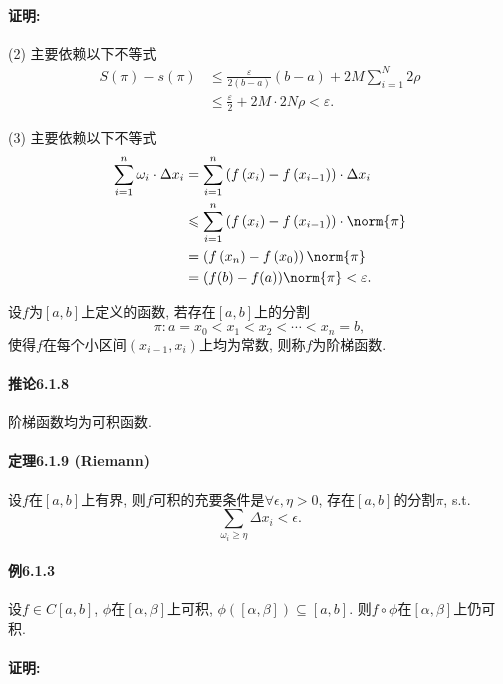 \paragraph{证明:}

(2) 主要依赖以下不等式
\[
\begin{aligned}S(\pi)-s(\pi) & \leqslant\frac{\varepsilon}{2(b-a)}(b-a)+2M\sum_{i=1}^{N}2\rho\\
	& \leqslant\frac{\varepsilon}{2}+2M\cdot2N\rho<\varepsilon.
\end{aligned}
\]

(3) 主要依赖以下不等式
\[
\begin{aligned}\sum_{i=1}^{n}\omega_{i}\cdot\Delta x_{i} & =\sum_{i=1}^{n}\left(f\left(x_{i}\right)-f\left(x_{i-1}\right)\right)\cdot\Delta x_{i}\\
	& \leqslant\sum_{i=1}^{n}\left(f\left(x_{i}\right)-f\left(x_{i-1}\right)\right)\cdot\norm{\pi}\\
	& =\left(f\left(x_{n}\right)-f\left(x_{0}\right)\right)\norm{\pi}\\
	& =(f(b)-f(a))\norm{\pi}<\varepsilon.
\end{aligned}
\]

设$f$为$[a,b]$上定义的函数, 若存在$[a,b]$上的分割
\[
\pi:a=x_{0}<x_{1}<x_{2}<\cdots<x_{n}=b,
\]
使得$f$在每个小区间$(x_{i-1},x_{i})$上均为常数, 则称$f$为阶梯函数.

\paragraph{推论6.1.8}

阶梯函数均为可积函数.

\paragraph{定理6.1.9 (Riemann)}

设$f$在$[a,b]$上有界, 则$f$可积的充要条件是$\forall\epsilon,\eta>0$, 存在$[a,b]$的分割$\pi$,
s.t.
\[
\sum_{\omega_{i}\ge\eta}\Delta x_{i}<\epsilon.
\]


\paragraph{例6.1.3}

设$f\in C[a,b]$, $\phi$在$[\alpha,\beta]$上可积, $\phi([\alpha,\beta])\subseteq[a,b]$.
则$f\circ\phi$在$[\alpha,\beta]$上仍可积.

\paragraph{证明:}

